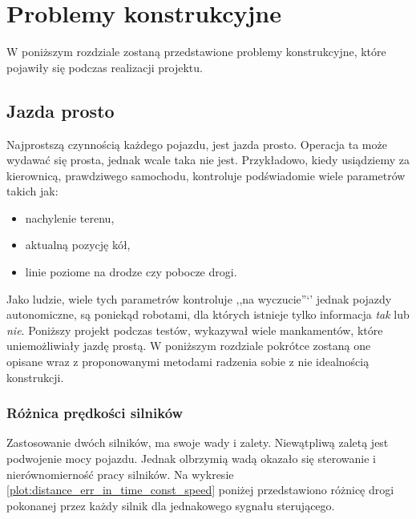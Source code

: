 \section{Problemy konstrukcyjne}
\label{sec:problemy_konstrukcyjne}
    W poniższym rozdziale zostaną przedstawione problemy konstrukcyjne,
    które pojawiły się podczas realizacji projektu.

    \subsection{Jazda prosto}
    \label{section:jazda_prosto}
        Najprostszą czynnością każdego pojazdu, jest jazda prosto.
        Operacja ta może wydawać się prosta, jednak wcale taka nie jest.
        Przykładowo, kiedy usiądziemy za kierownicą, prawdziwego samochodu, kontroluje podświadomie wiele parametrów takich jak:
        \begin{itemize}
            \item nachylenie terenu,
            \item aktualną pozycję kół,
            \item linie poziome na drodze czy pobocze drogi.
        \end{itemize}
        Jako ludzie, wiele tych parametrów kontroluje ,,na wyczucie''`' jednak pojazdy autonomiczne, są poniekąd robotami, dla których istnieje tylko informacja \textit{tak} lub \textit{nie}.
        Poniższy projekt podczas testów, wykazywał wiele mankamentów, które uniemożliwiały jazdę prostą.
        W poniższym rozdziale pokrótce zostaną one opisane wraz z proponowanymi metodami radzenia sobie z nie idealnością konstrukcji.

        \subsubsection{Różnica prędkości silników}
            Zastosowanie dwóch silników, ma swoje wady i zalety.
            Niewątpliwą zaletą jest podwojenie mocy pojazdu.
            Jednak olbrzymią wadą okazało się sterowanie i nierównomierność pracy silników.
            Na wykresie \ref{plot:distance_err_in_time_const_speed} poniżej przedstawiono różnicę drogi pokonanej przez każdy silnik dla jednakowego sygnału sterującego.

